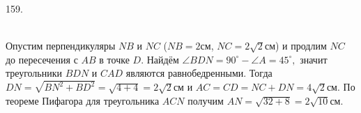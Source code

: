 159. \begin{figure}[ht!]
\end{figure}\\
Опустим перпендикуляры $NB$ и $NC$ ($NB=2$см, $NC=2\sqrt{2}$см) и продлим $NC$ до пересечения с $AB$ в точке $D.$ Найдём $\angle BDN=90^\circ-\angle A=45^\circ,$ значит треугольники $BDN$ и $CAD$ являются равнобедренными. Тогда $DN=\sqrt{BN^2+BD^2}=\sqrt{4+4}=2\sqrt{2}$см и $AC=CD=NC+DN=4\sqrt{2}$см. По теореме Пифагора для треугольника $ACN$ получим $AN=\sqrt{32+8}=2\sqrt{10}$см.\\
